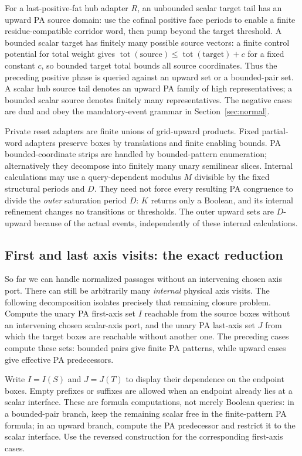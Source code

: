 \documentclass[11pt,a4paper]{article}
\theoremstyle{remark}
\newcommand{\tot}[1]{\operatorname{tot}(#1)}
\begin{document}
For a last-positive-fat hub adapter \(R\), an unbounded scalar target tail has an upward PA source domain: use the cofinal positive face periods to enable a finite residue-compatible corridor word, then pump beyond the target threshold. A bounded scalar target has finitely many possible source vectors: a finite control potential for total weight gives \(\tot{\text{source}}\le \tot{\text{target}}+c\) for a fixed constant \(c\), so bounded target total bounds all source coordinates. Thus the preceding positive phase is queried against an upward set or a bounded-pair set. A scalar hub source tail denotes an upward PA family of high representatives; a bounded scalar source denotes finitely many representatives. The negative cases are dual and obey the mandatory-event grammar in Section~\ref{sec:normal}.

Private reset adapters are finite unions of grid-upward products. Fixed partial-word adapters preserve boxes by translations and finite enabling bounds. PA bounded-coordinate strips are handled by bounded-pattern enumeration; alternatively they decompose into finitely many unary semilinear slices. Internal calculations may use a query-dependent modulus \(M\) divisible by the fixed structural periods and \(D\). They need not force every resulting PA congruence to divide the \emph{outer} saturation period \(D\): \(K\) returns only a Boolean, and its internal refinement changes no transitions or thresholds. The outer upward sets are \(D\)-upward because of the actual events, independently of these internal calculations.

\subsection{First and last axis visits: the exact reduction}

So far we can handle normalized passages without an intervening chosen
axis port. There can still be arbitrarily many \emph{internal} physical
axis visits. The following decomposition isolates precisely that
remaining closure problem. Compute the unary PA first-axis set \(I\) reachable from the source boxes without an intervening chosen scalar-axis port, and the unary PA last-axis set \(J\) from which the target boxes are reachable without another one. The preceding cases compute these sets: bounded pairs give finite PA patterns, while upward cases give effective PA predecessors.

Write \(I=I(S)\) and \(J=J(T)\) to display their dependence on the
endpoint boxes. Empty prefixes or suffixes are allowed when an endpoint
already lies at a scalar interface. These are formula computations,
not merely Boolean queries: in a bounded-pair branch, keep the
remaining scalar free in the finite-pattern PA formula; in an upward
branch, compute the PA predecessor and restrict it to the scalar
interface. Use the reversed construction for the corresponding
first-axis cases.
\end{document}
